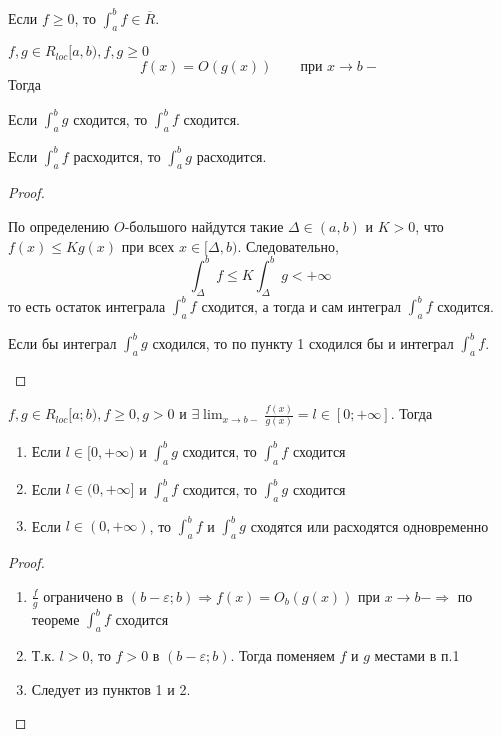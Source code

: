\begin{Rem}
	Если $f \geqslant 0$, то $\int_a^b f \in \overline{R}$.
\end{Rem}

\begin{Thm}
	$f, g \in R_{loc} [a, b), f, g \geqslant 0$
	\[f(x) = O(g(x)) \qquad \textrm{при } x \to b-\]
	Тогда 
	\begin{MyList}
		\item Если $\int_a^b g$ сходится, то $\int_a^b f$ сходится.
		\item Если $\int_a^b f$ расходится, то $\int_a^b g$ расходится.
	\end{MyList}
\end{Thm}

\begin{proof}
	\begin{MyList}
		\item По определению $O$-большого найдутся такие $\Delta \in (a, b)$ и $K > 0$, что $f(x) \leqslant Kg(x)$ при всех $x \in [\Delta, b)$. Следовательно,
		\[\int_\Delta^b f \leqslant K \int_\Delta^b g < +\infty\]
		то есть остаток интеграла $\int_a^b f$ сходится, а тогда и сам интеграл $\int_a^b f$ сходится.

		\item Если бы интеграл $\int_a^b g$ сходился, то по пункту 1 сходился бы и интеграл $\int_a^b f$.
	\end{MyList} 
\end{proof}

\def\AuthorName{Ксения Кузьмина}

\begin{Cons}
	$f, g \in R_{loc}[a;b), f \geqslant 0, g > 0$ и $\displaystyle \exists \lim_{x \to b-} \frac{f(x)}{g(x)} = l \in [0;+\infty]$. Тогда
	\begin{enumerate}
		\item Если $l \in [0, + \infty)$ и $\displaystyle \int_{a}^{b} g$ сходится, то $\displaystyle \int_{a}^{b} f$ сходится
		\item Если $l \in (0, + \infty]$ и $\displaystyle \int_{a}^{b} f$ сходится, то $\displaystyle \int_{a}^{b} g$ сходится
		\item Если $l \in (0, + \infty)$, то $\displaystyle \int_{a}^{b} f$ и $\displaystyle \int_{a}^{b} g$ сходятся или расходятся одновременно
	\end{enumerate}
\end{Cons}

\begin{proof}
	\begin{enumerate}
		\item $\displaystyle \frac{f}{g}$ ограничено в $(b - \varepsilon; b) \Rightarrow f(x) = O_b(g(x))$ при $x \to b- \Rightarrow$ по теореме $\displaystyle \int_{a}^{b} f$ сходится
		\item Т.к. $l>0$, то $f > 0$ в $(b - \varepsilon; b).$ Тогда поменяем $f$ и $g$ местами в п.1
		\item Следует из пунктов 1 и 2.
	\end{enumerate}
\end{proof}

